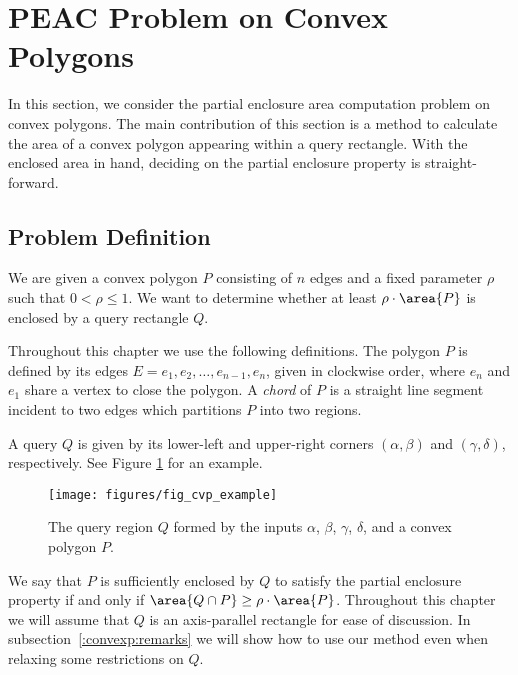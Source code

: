 \section{PEAC Problem on Convex Polygons}
\label{:convexp}

In this section, we consider the partial enclosure area computation 
problem on convex polygons. 
The main contribution of this section is a method to calculate the area of a convex polygon appearing within a query rectangle. 
With the enclosed area in hand, deciding on the partial enclosure property is straight-forward.


\subsection{Problem Definition}
\label{:convexp:problem-definition}

\begin{problem}
We are given a convex polygon $P$ consisting of $n$ edges and a fixed parameter $\rho$ such that $0 < \rho \leq 1$. We want to determine whether at least $\rho \cdot \area{P}$ is enclosed by a query rectangle $Q$.
\end{problem}

Throughout this chapter we use the following definitions. The polygon $P$ is defined by its edges $E = e_1, e_2, \ldots, e_{n-1}, e_n$, given in clockwise order, where $e_n$ and $e_1$ share a vertex to close the polygon.  A \emph{chord} of $P$ is a straight line segment incident to two edges which partitions $P$ into two regions.

A query $Q$ is given by its lower-left and upper-right corners $(\alpha, \beta)$ and $(\gamma, \delta)$, respectively. See Figure \ref{fig:convexp:example} for an example.

\begin{figure}[t]
\begin{center}
  \texttt{[image: figures/fig\_cvp\_example]}
  \caption[A convex polygon $P$ and query box $Q$.]{The query region $Q$ formed by the inputs $\alpha$, $\beta$, $\gamma$,  $\delta$, and a convex polygon $P$.}
  \label{fig:convexp:example}
\end{center}
\end{figure}

We say that $P$ is sufficiently enclosed by $Q$ to satisfy the partial enclosure property if and only if $\area{Q \cap P} \geq \rho \cdot \area{P}$. 
Throughout this chapter we will assume that $Q$ is an axis-parallel rectangle for ease of discussion. 
In subsection~\ref{:convexp:remarks} we will show how to use our method even when relaxing some restrictions on $Q$.

